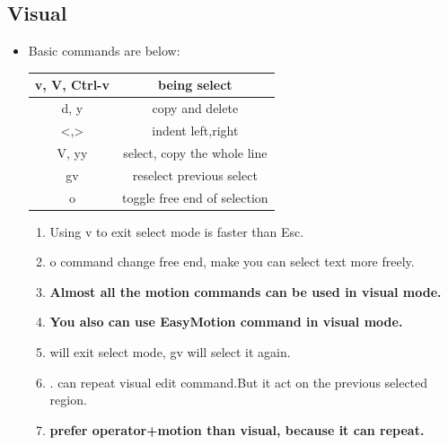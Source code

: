 \documentclass[a4paper,12pt,twoside]{book}
\begin{document}
\subsection{Visual}
\begin{itemize} 
		\item Basic commands are below:
		\begin{center}
				\begin{tabular}{c|c}
						\hline
						v, V, Ctrl-v  & being select\\

						\hline 
						d, y & copy and delete\\

						\hline
						<,> & indent left,right\\

						\hline
						V, yy & select, copy the whole line  \\

						\hline
						gv & reselect previous select \\
						
						\hline 
						o & toggle free end of selection \\

						\hline 		
				\end{tabular}
		\end{center}

	\begin{enumerate}
			\item Using v to exit select mode is faster than Esc. 

			\item o command change free end, make you can select text more freely.

			\item \textbf{Almost all the motion commands can be used in visual mode.}

			\item \textbf{You also can use EasyMotion command in visual mode.}
					
			\item <,> will exit select mode, gv will select it again. 

			\item . can repeat visual edit command.But it act on the previous selected region.  
					
			\item \textbf{prefer operator+motion than visual, because it can repeat.}
	\end{enumerate}					

	\end{itemize}
\end{document}
